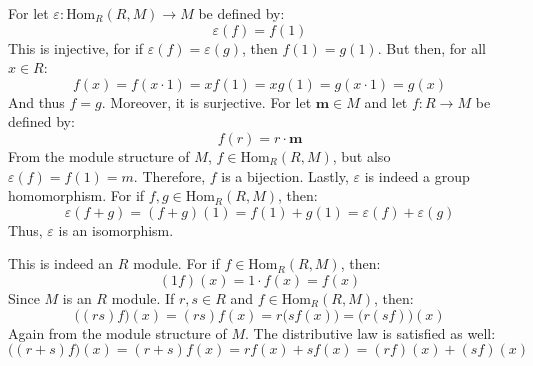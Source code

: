 \documentclass[crop=false,class=article]{standalone}                       %
\begin{document}
        \begin{solution}
            For let $\varepsilon:\textrm{Hom}_{R}(R,M)\rightarrow{M}$ be
            defined by:
            \begin{equation}
                \varepsilon(f)=f(1)
            \end{equation}
            This is injective, for if $\varepsilon(f)=\varepsilon(g)$,
            then $f(1)=g(1)$. But then, for all $x\in{R}$:
            \begin{equation}
                f(x)=f(x\cdot{1})=xf(1)=xg(1)=g(x\cdot{1})=g(x)
            \end{equation}
            And thus $f=g$. Moreover, it is surjective. For let
            $\mathbf{m}\in{M}$ and let $f:R\rightarrow{M}$ be defined by:
            \begin{equation}
                f(r)=r\cdot\mathbf{m}
            \end{equation}
            From the module structure of $M$, $f\in\textrm{Hom}_{R}(R,M)$,
            but also $\varepsilon(f)=f(1)=m$. Therefore, $f$ is a bijection.
            Lastly, $\varepsilon$ is indeed a group homomorphism. For if
            $f,g\in\textrm{Hom}_{R}(R,M)$, then:
            \begin{equation}
                \varepsilon(f+g)=(f+g)(1)=f(1)+g(1)
                                =\varepsilon(f)+\varepsilon(g)
            \end{equation}
            Thus, $\varepsilon$ is an isomorphism.
            \par\hfill\par
            This is indeed an $R$ module. For if
            $f\in\textrm{Hom}_{R}(R,M)$, then:
            \begin{equation}
                (1f)(x)=1\cdot{f}(x)=f(x)
            \end{equation}
            Since $M$ is an $R$ module. If $r,s\in{R}$ and
            $f\in\textrm{Hom}_{R}(R,M)$, then:
            \begin{equation}
                \big((rs)f\big)(x)
                =(rs)f(x)
                =r\big(sf(x)\big)
                =\big(r(sf)\big)(x)
            \end{equation}
            Again from the module structure of $M$. The distributive law
            is satisfied as well:
            \begin{equation}
                \big((r+s)f)(x)=(r+s)f(x)=rf(x)+sf(x)=(rf)(x)+(sf)(x)
            \end{equation}

\end{solution}
\end{document}
